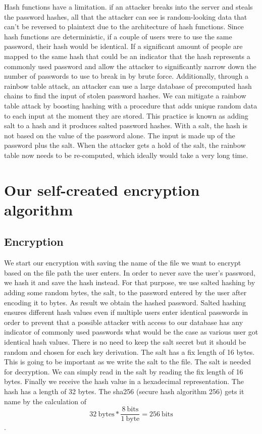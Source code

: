 \documentclass[]{article}
\begin{document}
Hash functions have a limitation. if an attacker breaks into the server and steals the password hashes, all that the 
attacker can see is random-looking data that can't be reversed to plaintext due to the architecture of hash functions.
Since hash functions are deterministic, if a couple of users 
were to use the same password, their hash would be identical. If a significant amount of people are mapped to the same 
hash that could be an indicator that the hash represents a commonly used password and allow the attacker to significantly 
narrow down the number of passwords to use to break in by brute force. Additionally, through a rainbow table attack, 
an attacker can use a large database of precomputed hash chains to find the input of stolen password hashes. We can 
mitigate a rainbow table attack by boosting hashing with a procedure that adds unique random data to each input at the 
moment they are stored. This practice is known as adding salt to a hash and it produces salted password hashes.
With a salt, the hash is not based on the value of the password alone. The input is made up of the password plus the salt.
When the attacker gets a hold of the salt, the rainbow table now needs to be re-computed, which ideally would take a very 
long time. \cite{auth0}



\section{Our self-created encryption algorithm}
\subsection{Encryption}
We start our encryption with saving the name of the file we want to encrypt based on the file path the user enters. 
In order to never save the user's password, we hash it and save the hash instead. For that purpose, we use salted hashing
by adding some random bytes, the salt, to the password entered by the user after encoding it to bytes. As result we obtain 
the hashed password. Salted hashing ensures different hash values even if multiple users enter identical passwords in order 
to prevent that a possible attacker with access to our database has any indicator of commonly used passwords what would be 
the case as various user got identical hash values. There is no need to keep the salt secret but it should be random and chosen 
for each key derivation. The salt has a fix length of 16 bytes. This is going to be important 
as we write the salt to the file. The salt is needed for decryption. We can simply read in the salt by reading the fix 
length of 16 bytes. Finally we receive the hash value in a hexadecimal representation. The hash has a length of 32 bytes.
The sha256 (secure hash algorithm 256) gets it name by the calculation of 
$$32\ \text{bytes} * \frac{8\ \text{bits}}{1\ \text{byte}} = 256\ \text{bits}$$.
\end{document}
